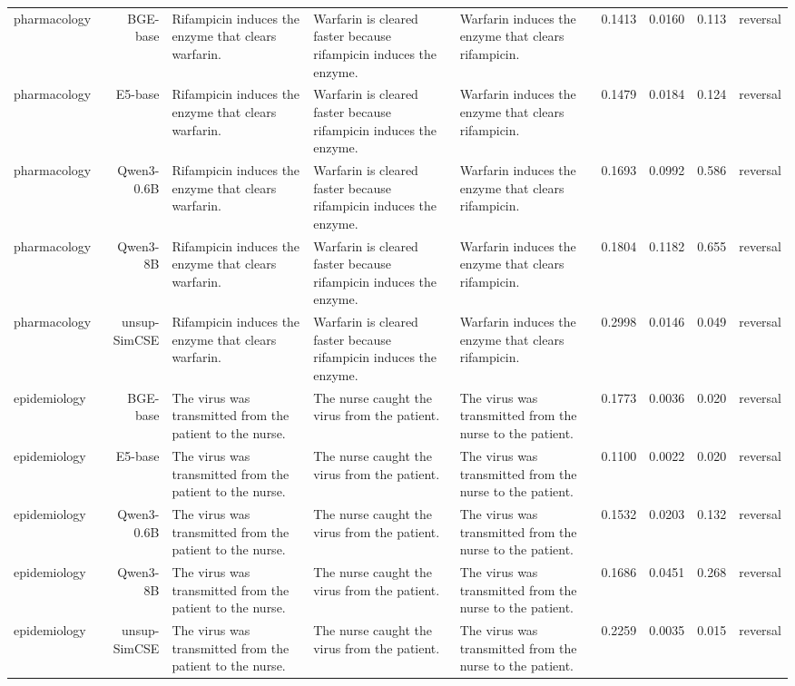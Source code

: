 \documentclass[10pt]{article}
\begin{document}
\begin{longtable}{lr>{\raggedright\arraybackslash}p{4.6cm}>{\raggedright\arraybackslash}p{4.6cm}>{\raggedright\arraybackslash}p{4.6cm}rrrr}
pharmacology & BGE-base & Rifampicin induces the enzyme that clears warfarin. & Warfarin is cleared faster because rifampicin induces the enzyme. & Warfarin induces the enzyme that clears rifampicin. & 0.1413 & 0.0160 & 0.113 & reversal \\
pharmacology & E5-base & Rifampicin induces the enzyme that clears warfarin. & Warfarin is cleared faster because rifampicin induces the enzyme. & Warfarin induces the enzyme that clears rifampicin. & 0.1479 & 0.0184 & 0.124 & reversal \\
pharmacology & Qwen3-0.6B & Rifampicin induces the enzyme that clears warfarin. & Warfarin is cleared faster because rifampicin induces the enzyme. & Warfarin induces the enzyme that clears rifampicin. & 0.1693 & 0.0992 & 0.586 & reversal \\
pharmacology & Qwen3-8B & Rifampicin induces the enzyme that clears warfarin. & Warfarin is cleared faster because rifampicin induces the enzyme. & Warfarin induces the enzyme that clears rifampicin. & 0.1804 & 0.1182 & 0.655 & reversal \\
pharmacology & unsup-SimCSE & Rifampicin induces the enzyme that clears warfarin. & Warfarin is cleared faster because rifampicin induces the enzyme. & Warfarin induces the enzyme that clears rifampicin. & 0.2998 & 0.0146 & 0.049 & reversal \\
epidemiology & BGE-base & The virus was transmitted from the patient to the nurse. & The nurse caught the virus from the patient. & The virus was transmitted from the nurse to the patient. & 0.1773 & 0.0036 & 0.020 & reversal \\
epidemiology & E5-base & The virus was transmitted from the patient to the nurse. & The nurse caught the virus from the patient. & The virus was transmitted from the nurse to the patient. & 0.1100 & 0.0022 & 0.020 & reversal \\
epidemiology & Qwen3-0.6B & The virus was transmitted from the patient to the nurse. & The nurse caught the virus from the patient. & The virus was transmitted from the nurse to the patient. & 0.1532 & 0.0203 & 0.132 & reversal \\
epidemiology & Qwen3-8B & The virus was transmitted from the patient to the nurse. & The nurse caught the virus from the patient. & The virus was transmitted from the nurse to the patient. & 0.1686 & 0.0451 & 0.268 & reversal \\
epidemiology & unsup-SimCSE & The virus was transmitted from the patient to the nurse. & The nurse caught the virus from the patient. & The virus was transmitted from the nurse to the patient. & 0.2259 & 0.0035 & 0.015 & reversal \\

\end{longtable}
\end{document}
